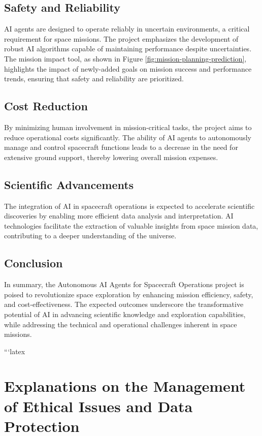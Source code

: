 \documentclass[a4paper, 11pt]{article}
\begin{document}
\subsection{Safety and Reliability}

AI agents are designed to operate reliably in uncertain environments, a critical requirement for space missions. The project emphasizes the development of robust AI algorithms capable of maintaining performance despite uncertainties. The mission impact tool, as shown in Figure \ref{fig:mission-planning-prediction}, highlights the impact of newly-added goals on mission success and performance trends, ensuring that safety and reliability are prioritized.

\subsection{Cost Reduction}

By minimizing human involvement in mission-critical tasks, the project aims to reduce operational costs significantly. The ability of AI agents to autonomously manage and control spacecraft functions leads to a decrease in the need for extensive ground support, thereby lowering overall mission expenses.

\subsection{Scientific Advancements}

The integration of AI in spacecraft operations is expected to accelerate scientific discoveries by enabling more efficient data analysis and interpretation. AI technologies facilitate the extraction of valuable insights from space mission data, contributing to a deeper understanding of the universe.

\subsection{Conclusion}

In summary, the Autonomous AI Agents for Spacecraft Operations project is poised to revolutionize space exploration by enhancing mission efficiency, safety, and cost-effectiveness. The expected outcomes underscore the transformative potential of AI in advancing scientific knowledge and exploration capabilities, while addressing the technical and operational challenges inherent in space missions.

```latex
\section{Explanations on the Management of Ethical Issues and Data Protection}
\end{document}
